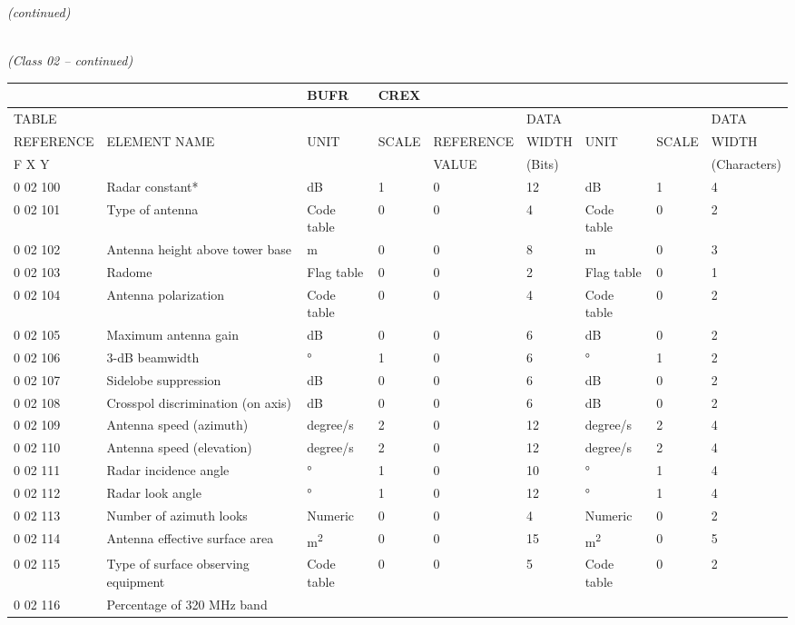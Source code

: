 \emph{(continued)}

\emph{\\
(Class 02 -- continued)}

\begin{longtable}[]{@{}lllllllll@{}}
\toprule
& & BUFR & CREX & & & & &\tabularnewline
\midrule
\endhead
TABLE & & & & & DATA & & & DATA\tabularnewline
REFERENCE & ELEMENT NAME & UNIT & SCALE & REFERENCE & WIDTH & UNIT & SCALE & WIDTH\tabularnewline
F X Y & & & & VALUE & (Bits) & & & (Characters)\tabularnewline
0 02 100 & Radar constant* & dB & 1 & 0 & 12 & dB & 1 & 4\tabularnewline
0 02 101 & Type of antenna & Code table & 0 & 0 & 4 & Code table & 0 & 2\tabularnewline
0 02 102 & Antenna height above tower base & m & 0 & 0 & 8 & m & 0 & 3\tabularnewline
0 02 103 & Radome & Flag table & 0 & 0 & 2 & Flag table & 0 & 1\tabularnewline
0 02 104 & Antenna polarization & Code table & 0 & 0 & 4 & Code table & 0 & 2\tabularnewline
0 02 105 & Maximum antenna gain & dB & 0 & 0 & 6 & dB & 0 & 2\tabularnewline
0 02 106 & 3-dB beamwidth & ° & 1 & 0 & 6 & ° & 1 & 2\tabularnewline
0 02 107 & Sidelobe suppression & dB & 0 & 0 & 6 & dB & 0 & 2\tabularnewline
0 02 108 & Crosspol discrimination (on axis) & dB & 0 & 0 & 6 & dB & 0 & 2\tabularnewline
0 02 109 & Antenna speed (azimuth) & degree/s & 2 & 0 & 12 & degree/s & 2 & 4\tabularnewline
0 02 110 & Antenna speed (elevation) & degree/s & 2 & 0 & 12 & degree/s & 2 & 4\tabularnewline
0 02 111 & Radar incidence angle & ° & 1 & 0 & 10 & ° & 1 & 4\tabularnewline
0 02 112 & Radar look angle & ° & 1 & 0 & 12 & ° & 1 & 4\tabularnewline
0 02 113 & Number of azimuth looks & Numeric & 0 & 0 & 4 & Numeric & 0 & 2\tabularnewline
0 02 114 & Antenna effective surface area & m\textsuperscript{2} & 0 & 0 & 15 & m\textsuperscript{2} & 0 & 5\tabularnewline
0 02 115 & Type of surface observing equipment & Code table & 0 & 0 & 5 & Code table & 0 & 2\tabularnewline
\begin{minipage}[t]{0.08\columnwidth}\raggedright
0 02 116\strut
\end{minipage} & \begin{minipage}[t]{0.08\columnwidth}\raggedright
Percentage of 320 MHz band


\end{minipage}
\end{longtable}
